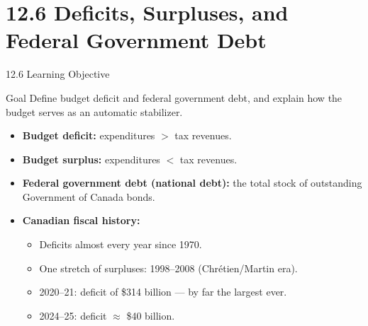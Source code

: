 \documentclass[aspectratio=169]{beamer}
\begin{document}
\section{12.6 Deficits, Surpluses, and Federal Government Debt}

\begin{frame}{12.6 Learning Objective}
\transfade
\begin{block}{Goal}
Define budget deficit and federal government debt, and explain how the budget serves as an automatic stabilizer.
\end{block}
\begin{itemize}[<+->]
  \item \textbf{Budget deficit:} expenditures $>$ tax revenues.
  \item \textbf{Budget surplus:} expenditures $<$ tax revenues.
  \item \textbf{Federal government debt (national debt):} the total stock of outstanding Government of Canada bonds.
  \item \textbf{Canadian fiscal history:}
  \begin{itemize}[<+->]
    \item Deficits almost every year since 1970.
    \item One stretch of surpluses: 1998--2008 (Chrétien/Martin era).
    \item \alert{2020--21}: deficit of \$314 billion --- by far the largest ever.
    \item \alert{2024--25}: deficit $\approx$ \$40 billion.
  \end{itemize}
\end{itemize}
\end{frame}
\end{document}
